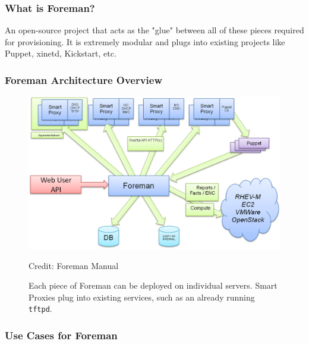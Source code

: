 \documentclass{beamer}
\begin{document}
\begin{frame}
	\frametitle{What is Foreman?}
	An open-source project that acts as the "glue" between all of these pieces required for provisioning.
	It is extremely modular and plugs into existing projects like Puppet, xinetd, Kickstart, etc.
\end{frame}

\begin{frame}
	\frametitle{Foreman Architecture Overview}
	\begin{figure}[t]
		\includegraphics[width=\textwidth,height=\textheight-4cm,keepaspectratio]{foreman_architecture}

		\tiny Credit: Foreman Manual
		\vspace{0.1cm}

		\normalsize Each piece of Foreman can be deployed on individual servers. Smart Proxies plug into existing services, such as an already running \texttt{tftpd}.
	\end{figure}



\end{frame}

\begin{frame}
	\frametitle{Use Cases for Foreman}

\end{frame}
\end{document}
